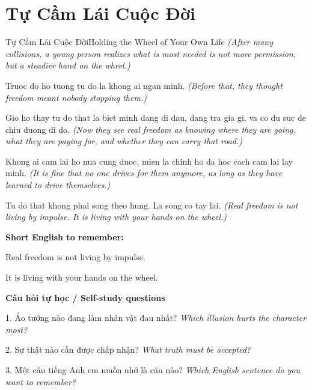 \section{Tự Cầm Lái Cuộc Đời}
\begin{truyen}{Tự Cầm Lái Cuộc Đời}{Holding the Wheel of Your Own Life}
\textit{(After many collisions, a young person realizes what is most needed is not more permission, but a steadier hand on the wheel.)}

Truoc do ho tuong tu do la khong ai ngan minh.
\textit{(Before that, they thought freedom meant nobody stopping them.)}

Gio ho thay tu do that la biet minh dang di dau, dang tra gia gi, va co du suc de chiu duong di do.
\textit{(Now they see real freedom as knowing where they are going, what they are paying for, and whether they can carry that road.)}

Khong ai cam lai ho nua cung duoc, mien la chinh ho da hoc cach cam lai lay minh.
\textit{(It is fine that no one drives for them anymore, as long as they have learned to drive themselves.)}

\end{truyen}

\begin{baihoc}
Tu do that khong phai song theo hung. La song co tay lai.
\textit{(Real freedom is not living by impulse. It is living with your hands on the wheel.)}
\end{baihoc}

\begin{ghinhoanh}
\textbf{Short English to remember:}

Real freedom is not living by impulse.

It is living with your hands on the wheel.

\end{ghinhoanh}

\begin{tuhocnhanh}
\textbf{Câu hỏi tự học / Self-study questions}

1. Ảo tưởng nào đang làm nhân vật đau nhất? \textit{Which illusion hurts the character most?}

2. Sự thật nào cần được chấp nhận? \textit{What truth must be accepted?}

3. Một câu tiếng Anh em muốn nhớ là câu nào? \textit{Which English sentence do you want to remember?}
\end{tuhocnhanh}
